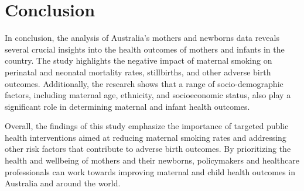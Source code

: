 \section{Conclusion}
In conclusion, the analysis of Australia's mothers and newborns data reveals several crucial insights into the health outcomes of mothers and infants in the country. The study highlights the negative impact of maternal smoking on perinatal and neonatal mortality rates, stillbirths, and other adverse birth outcomes. Additionally, the research shows that a range of socio-demographic factors, including maternal age, ethnicity, and socioeconomic status, also play a significant role in determining maternal and infant health outcomes.

Overall, the findings of this study emphasize the importance of targeted public health interventions aimed at reducing maternal smoking rates and addressing other risk factors that contribute to adverse birth outcomes. By prioritizing the health and wellbeing of mothers and their newborns, policymakers and healthcare professionals can work towards improving maternal and child health outcomes in Australia and around the world.